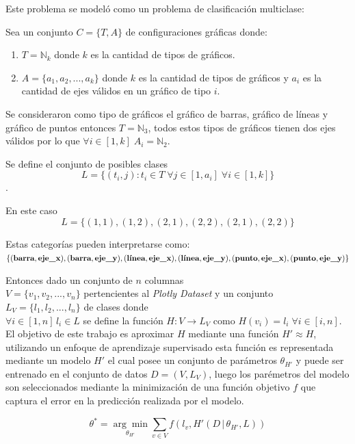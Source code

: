\documentclass[a4paper,10pt,twocolumn]{article}
\begin{document}
	Este problema se model\'o como un problema de clasificaci\'on multiclase:
	
	Sea un conjunto $C = \{T, A\}$ de configuraciones gr\'aficas donde:
	\begin{enumerate}
		\item $T = \mathbb{N}_k$ donde $k$ es la cantidad de tipos de gr\'aficos.
		\item $A = \{a_1, a_2,...,a_k\}$ donde $k$ es la cantidad de tipos de gr\'aficos y $a_i$ es la
		cantidad de ejes v\'alidos en un gr\'afico de tipo $i$.
	\end{enumerate}
		
	Se consideraron como tipo de gr\'aficos el gr\'afico de barras, gr\'afico de l\'ineas y gr\'afico de puntos entonces $T = \mathbb{N}_3$, 
	todos estos tipos de gr\'aficos tienen dos ejes v\'alidos por lo que $\forall i \in [1,k] \; A_i = \mathbb{N}_2$.

	Se define el conjunto de posibles clases
	$$L = \{ (t_i, j): t_i \in T \;\forall j \in [1, a_i] \;\forall i \in [1,k] \}$$.

	En este caso $$L = \{ (1,1),(1,2),(2,1),(2,2),(2,1),(2,2) \}$$
	
	Estas categor\'ias pueden interpretarse como:\\
	$\{(\textbf{barra}, \textbf{eje\_x}), (\textbf{barra}, \textbf{eje\_y}),
	(\textbf{l\'inea}, \textbf{eje\_x})\\, (\textbf{l\'inea}, \textbf{eje\_y}),
	(\textbf{punto}, \textbf{eje\_x}), (\textbf{punto}, \textbf{eje\_y}) \}$

	Entonces dado un conjunto de $n$ columnas\\ $V = \{v_1, v_2, ..., v_n \}$ pertencientes al \textit{Plotly Dataset} y 
	un conjunto $L_V = \{l_1, l_2,...,l_n\}$ de clases donde \\$\forall i \in [1,n]\, l_i \in L$ se define la funci\'on
	$H:V \to L_V$ como $H(v_i) = l_i \;\forall i \in [i,n]$. El objetivo de este trabajo es aproximar $H$ mediante
	una funci\'on $H' \approx H$, utilizando un enfoque de aprendizaje supervisado
	esta funci\'on es representada mediante un modelo $H'$ el cual posee un conjunto de
	par\'ametros $\theta_{H'}$ y puede ser entrenado en el conjunto de datos $D = (V,L_V)$, luego
	los par\'emetros del modelo son seleccionados mediante la minimizaci\'on de una funci\'on
	objetivo $f$ que captura el error en la predicci\'on realizada por el modelo.

	$$
		\theta^* = \underset{\theta_{H'}}{\arg \min} \underset{v \in V}{\sum} f(l_v, H'(D \,|\, \theta_{H'}, L))
	$$
\end{document}
